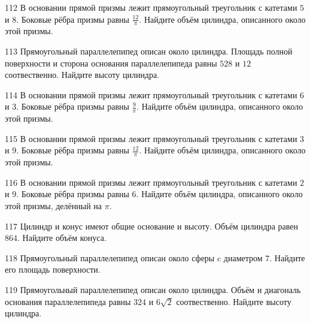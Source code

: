 \documentclass[4apaper]{article}
\begin{document}
\begin{taskBN}{112}
В основании прямой призмы лежит прямоугольный треугольник с катетами $5$ и $8$. Боковые рёбра призмы равны $\frac{12}{\pi}$. Найдите объём цилиндра, описанного около этой призмы.
\end{taskBN}

\begin{taskBN}{113}
Прямоугольный параллелепипед описан около цилиндра. Площадь полной поверхности и сторона основания параллелепипеда равны $528$ и $12$ соотвественно. Найдите высоту цилиндра.
\end{taskBN}

\begin{taskBN}{114}
В основании прямой призмы лежит прямоугольный треугольник с катетами $6$ и $3$. Боковые рёбра призмы равны $\frac{9}{\pi}$. Найдите объём цилиндра, описанного около этой призмы.
\end{taskBN}

\begin{taskBN}{115}
В основании прямой призмы лежит прямоугольный треугольник с катетами $3$ и $9$. Боковые рёбра призмы равны $\frac{12}{\pi}$. Найдите объём цилиндра, описанного около этой призмы.
\end{taskBN}

\begin{taskBN}{116}
В основании прямой призмы лежит прямоугольный треугольник с катетами $2$ и $9$. Боковые рёбра призмы равны $6$. Найдите объём цилиндра, описанного около этой призмы, делённый на $\pi$.
\end{taskBN}

\begin{taskBN}{117}
Цилиндр и конус имеют общие основание и высоту. Объём цилиндра равен $864$. Найдите объём конуса.
\end{taskBN}

\begin{taskBN}{118}
Прямоугольный параллелепипед описан около сферы c диаметром $7$. Найдите его площадь поверхности. 
\end{taskBN}

\begin{taskBN}{119}
Прямоугольный параллелепипед описан около цилиндра. Объём и диагональ основания параллелепипеда равны $324$ и $6\sqrt{2}$ соотвественно. Найдите высоту цилиндра.
\end{taskBN}
\end{document}
